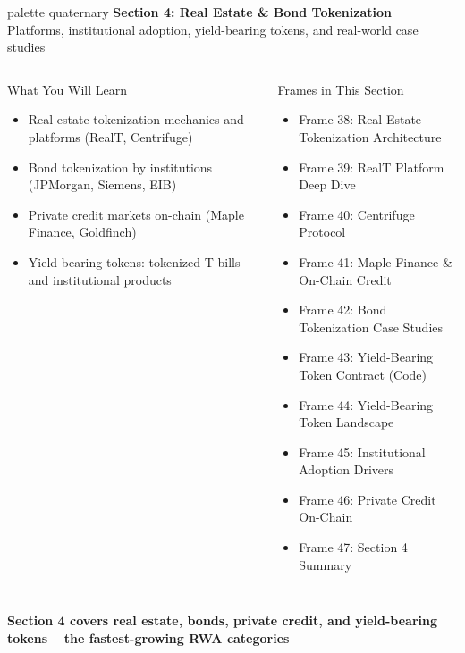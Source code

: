 \documentclass[8pt,aspectratio=169]{beamer}
\newcommand{\bottomnote}[1]{\vfill\vspace{-2mm}\textcolor{mllavender2}{\rule{\textwidth}{0.4pt}}\vspace{1mm}\footnotesize\textbf{#1}}
\begin{document}
\begin{frame}{}
\begin{beamercolorbox}[sep=12pt,center,rounded=true,shadow=true]{palette quaternary}
  {\Large\bfseries Section 4: Real Estate \& Bond Tokenization}\\[6pt]
  {\normalsize Platforms, institutional adoption, yield-bearing tokens, and real-world case studies}
\end{beamercolorbox}
\vspace{4mm}
\begin{columns}[T]
\begin{block}{What You Will Learn}
\footnotesize
\begin{itemize}
  \item Real estate tokenization mechanics and platforms (RealT, Centrifuge)
  \item Bond tokenization by institutions (JPMorgan, Siemens, EIB)
  \item Private credit markets on-chain (Maple Finance, Goldfinch)
  \item Yield-bearing tokens: tokenized T-bills and institutional products
\end{itemize}
\end{block}
\begin{block}{Frames in This Section}
\footnotesize
\begin{itemize}
  \item Frame 38: Real Estate Tokenization Architecture
  \item Frame 39: RealT Platform Deep Dive
  \item Frame 40: Centrifuge Protocol
  \item Frame 41: Maple Finance \& On-Chain Credit
  \item Frame 42: Bond Tokenization Case Studies
  \item Frame 43: Yield-Bearing Token Contract (Code)
  \item Frame 44: Yield-Bearing Token Landscape
  \item Frame 45: Institutional Adoption Drivers
  \item Frame 46: Private Credit On-Chain
  \item Frame 47: Section 4 Summary
\end{itemize}
\end{block}
\end{columns}
\bottomnote{Section 4 covers real estate, bonds, private credit, and yield-bearing tokens -- the fastest-growing RWA categories}
\end{frame}
\end{document}
